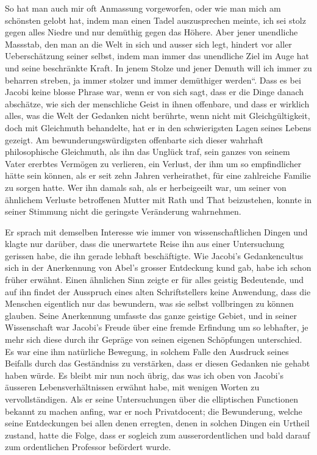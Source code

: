 \documentclass[11pt]{article}
\begin{document}
So hat man auch mir oft Anmassung vorgeworfen, oder wie man mich am schönsten gelobt hat, indem man einen Tadel auszusprechen meinte, ich sei stolz gegen alles Niedre und nur demüthig gegen das Höhere. Aber jener unendliche Massstab, den man an die Welt in sich und ausser sich legt, hindert vor aller Ueberschätzung seiner selbst, indem man immer das unendliche Ziel im Auge hat und seine beschränkte Kraft. In jenem Stolze und jener Demuth will ich immer zu beharren streben, ja immer stolzer und immer demüthiger werden“. Dass es bei Jacobi keine blosse Phrase war, wenn er von sich sagt, dass er die Dinge danach abschätze, wie sich der menschliche Geist in ihnen offenbare, und dass er wirklich alles, was die Welt der Gedanken nicht berührte, wenn nicht mit Gleichgültigkeit, doch mit Gleichmuth behandelte, hat er in den schwierigsten Lagen seines Lebens gezeigt. Am bewunderungswürdigsten offenbarte sich dieser wahrhaft philosophische Gleichmuth, als ihn das Unglück traf, sein ganzes von seinem Vater ererbtes Vermögen zu verlieren, ein Verlust, der ihm um so empfindlicher hätte sein können, als er seit zehn Jahren verheirathet, für eine zahlreiche Familie zu sorgen hatte. Wer ihn damals sah, als er herbeigeeilt war, um seiner von ähnlichem Verluste betroffenen Mutter mit Rath und That beizustehen, konnte in seiner Stimmung nicht die geringste Veränderung wahrnehmen.

Er sprach mit demselben Interesse wie immer von wissenschaftlichen Dingen und klagte nur darüber, dass die unerwartete Reise ihn aus einer Untersuchung gerissen habe, die ihn gerade lebhaft beschäftigte. Wie Jacobi’s Gedankencultus sich in der Anerkennung von Abel’s grosser Entdeckung kund gab, habe ich schon früher erwähnt. Einen ähnlichen Sinn zeigte er für alles geistig Bedeutende, und auf ihn findet der Ausspruch eines alten Schriftstellers keine Anwendung, dass die Menschen eigentlich nur das bewundern, was sie selbst vollbringen zu können glauben. Seine Anerkennung umfasste das ganze geistige Gebiet, und in seiner Wissenschaft war Jacobi's Freude über eine fremde Erfindung um so lebhafter, je mehr sich diese durch ihr Gepräge von seinen eigenen Schöpfungen unterschied. Es war eine ihm natürliche Bewegung, in solchem Falle den Ausdruck seines Beifalls durch das Geständniss zu verstärken, dass er diesen Gedanken nie gehabt haben würde. Es bleibt mir nun noch übrig, das was ich oben von Jacobi’s äusseren Lebensverhältnissen erwähnt habe, mit wenigen Worten zu vervollständigen. Als er seine Untersuchungen über die elliptischen Functionen bekannt zu machen anfing, war er noch Privatdocent; die Bewunderung, welche seine Entdeckungen bei allen denen erregten, denen in solchen Dingen ein Urtheil zustand, hatte die Folge, dass er sogleich zum ausserordentlichen und bald darauf zum ordentlichen Professor befördert wurde.
\end{document}
